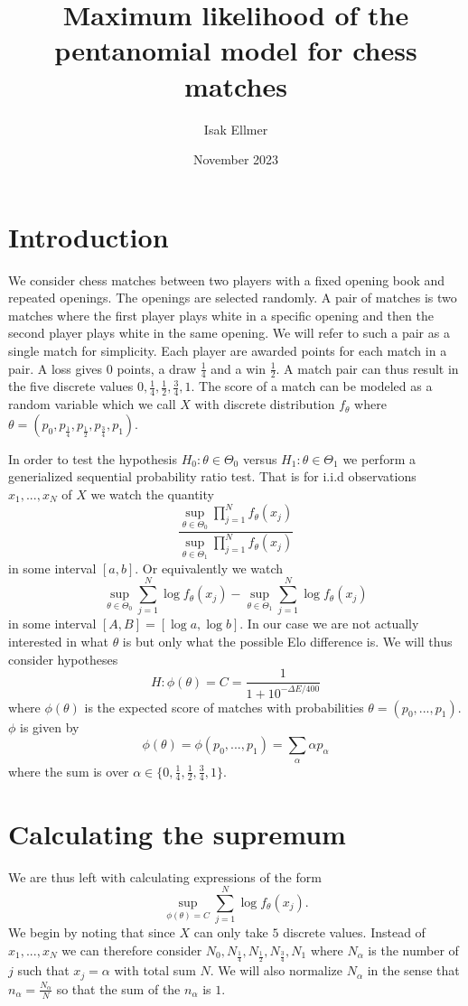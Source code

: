 \documentclass{article}
\title{Maximum likelihood of the pentanomial model for chess matches}
\author{Isak Ellmer}
\date{November 2023}
\begin{document}
\maketitle

\section{Introduction}
We consider chess matches between two players with a fixed opening book and repeated openings.
The openings are selected randomly. A pair of matches is two matches where the first player plays
white in a specific opening and then the second player plays white in the same opening. We will
refer to such a pair as a single match for simplicity. Each player are awarded points for each
match in a pair. A loss gives $0$ points, a draw $\frac{1}{4}$ and a win $\frac{1}{2}$. A match
pair can thus result in the five discrete values $0,\frac14,\frac12,\frac34,1$. The score of a
match can be modeled as a random variable which we call $X$ with discrete distribution $f_\theta$
where $\theta=(p_0,p_\frac14,p_\frac12,p_\frac34,p_1)$.

In order to test the hypothesis $H_0:\theta\in\Theta_0$ versus $H_1:\theta\in\Theta_1$ we perform
a generialized sequential probability ratio test. That is for i.i.d observations $x_1,...,x_N$ of
$X$ we watch the quantity $$\frac{\sup_{\theta\in\Theta_0}\prod_{j=1}^N f_\theta(x_j)}{\sup_{\theta
\in\Theta_1}\prod_{j=1}^N f_\theta(x_j)}$$ in some interval $[a,b]$. Or equivalently we watch $$\sup_
{\theta\in\Theta_0}\sum_{j=1}^N\log{f_\theta(x_j)}-\sup_{\theta\in\Theta_1}\sum_{j=1}^N\log{f_\theta
(x_j)}$$ in some interval $[A,B]=[\log a, \log b]$. In our case we are not actually interested in
what $\theta$ is but only what the possible Elo difference is. We will thus consider hypotheses
$$H:\phi(\theta)=C=\frac{1}{1+10^{-\Delta E/400}}$$ where $\phi(\theta)$ is the expected score of
matches with probabilities $\theta=(p_0,...,p_1)$. $\phi$ is given by $$\phi(\theta)=\phi(p_0,...,
p_1)=\sum_\alpha \alpha p_\alpha$$ where the sum is over $\alpha\in\{0,\frac14,\frac12,\frac34,1\}.$

\section{Calculating the supremum}
We are thus left with calculating expressions of the form $$\sup_{\phi(\theta)=C}\sum_{j=1}^N\log
{f_\theta(x_j)}.$$ We begin by noting that since $X$ can only take $5$ discrete values. Instead of
$x_1,...,x_N$ we can therefore consider $N_0,N_\frac14,N_\frac12,N_\frac34,N_1$ where $N_\alpha$
is the number of $j$ such that $x_j=\alpha$ with total sum $N$. We will also normalize $N_\alpha$
in the sense that $n_\alpha=\frac{N_\alpha}{N}$ so that the sum of the $n_\alpha$ is $1$.
\end{document}
